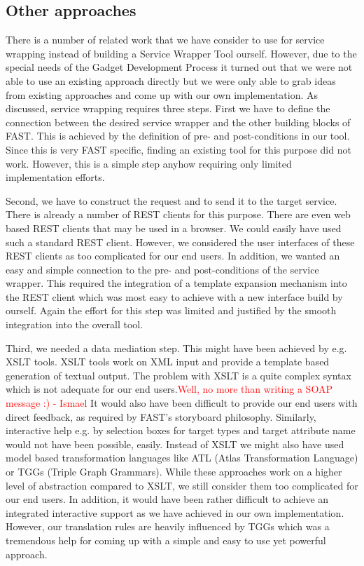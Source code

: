 \documentclass{fast_latex}
\begin{document}
{%

\subsection{Other approaches} %
\label{sub:other_approaches}

There is a number of related work that we have consider to use for service wrapping instead of building a Service Wrapper
Tool ourself. However, due to the special needs of the Gadget Development Process it turned out that we were not able 
to use an existing approach directly but we were only able to grab ideas from existing approaches and come up with our own implementation. 
As discussed, service wrapping requires three steps. First we have to define the connection between the desired service wrapper and the other building blocks of FAST. This is achieved by the definition of pre- and post-conditions in our tool. Since this is very FAST specific, finding an existing tool for this purpose did not work. However, this is a simple step anyhow requiring only limited implementation efforts. 

Second, we have to construct the request and to send it to the target service. There is already a number of REST clients 
for this purpose. There are even web based REST clients that may be used in a browser. We could easily have used such 
a standard REST client. However, we considered the user interfaces of these REST clients as too complicated for our
end users. In addition, we wanted an easy and simple connection to the pre- and post-conditions of the service wrapper. 
This required the integration of a template expansion mechanism into the REST client which was most easy to achieve 
with a new interface build by ourself. Again the effort for this step was limited and justified by the smooth integration into the overall tool. 

Third, we needed a data mediation step. This might have been achieved by e.g. XSLT tools. XSLT tools work on 
XML input and provide a template based generation of textual output. The problem with XSLT is a quite 
complex syntax which is not adequate for our end users.\textcolor{red}{Well, no more than writing a SOAP message :) - Ismael} It would also have been difficult to provide our end users with direct feedback, as required by FAST's storyboard philosophy. Similarly, interactive help e.g. by selection boxes for target types and target attribute name would not have been possible, easily. Instead of XSLT we might also have used model based transformation languages like ATL (Atlas Transformation Language) or TGGs (Triple Graph Grammars). While these approaches work on a higher level of abstraction compared to XSLT, we still consider them too complicated for our end users. 
In addition, it would have been rather difficult to achieve an integrated interactive support as we have achieved in our 
own implementation. However, our translation rules are heavily influenced by TGGs which was a tremendous help 
for coming up with a simple and easy to use yet powerful approach. 

}
\end{document}

